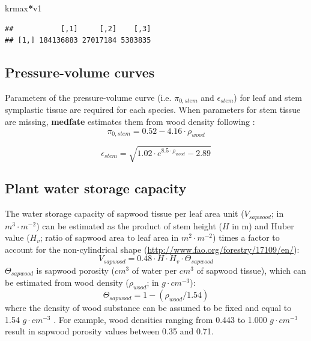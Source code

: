 \documentclass[]{book}
\newenvironment{Shaded}{\begin{snugshade}}{\end{snugshade}}
\newcommand{\OperatorTok}[1]{\textcolor[rgb]{0.81,0.36,0.00}{\textbf{#1}}}
\newcommand{\NormalTok}[1]{#1}
\begin{document}
\begin{Shaded}
\begin{Highlighting}[]
\NormalTok{krmax}\OperatorTok{*}\NormalTok{v1}
\end{Highlighting}
\end{Shaded}

\begin{verbatim}
##           [,1]     [,2]    [,3]
## [1,] 184136883 27017184 5383835
\end{verbatim}

\hypertarget{pressure-volume-curves-1}{%
\subsection{Pressure-volume curves}\label{pressure-volume-curves-1}}

Parameters of the pressure-volume curve (i.e. \(\pi_{0,stem}\) and \(\epsilon_{stem}\)) for leaf and stem symplastic tissue are required for each species. When parameters for stem tissue are missing, \textbf{medfate} estimates them from wood density following \citet{Christoffersen2016}:
\begin{equation}
\pi_{0,stem} = 0.52 - 4.16 \cdot \rho_{wood}
\end{equation}

\begin{equation}
\epsilon_{stem} = \sqrt{1.02 \cdot e^{8.5\cdot \rho_{wood}}-2.89}
\end{equation}

\hypertarget{plant-water-storage-capacity}{%
\subsection{Plant water storage capacity}\label{plant-water-storage-capacity}}

The water storage capacity of sapwood tissue per leaf area unit (\(V_{sapwood}\); in \(m^3 \cdot m^{-2}\)) can be estimated as the product of stem height (\(H\) in m) and Huber value (\(H_v\); ratio of sapwood area to leaf area in \(m^2 \cdot m^{-2}\)) times a factor to account for the non-cylindrical shape (\url{http://www.fao.org/forestry/17109/en/}):
\begin{equation}
V_{sapwood} = 0.48 \cdot H \cdot H_v \cdot \Theta_{sapwood}
\end{equation}
\(\Theta_{sapwood}\) is sapwood porosity (\(cm^3\) of water per \(cm^3\) of sapwood tissue), which can be estimated from wood density (\(\rho_{wood}\); in \(g \cdot cm^{-3}\)):
\begin{equation}
\Theta_{sapwood} = 1 - (\rho_{wood} / 1.54)
\end{equation}
where the density of wood substance can be assumed to be fixed and equal to 1.54 \(g \cdot cm^{-3}\) \citep{Dunlap1914}. For example, wood densities ranging from 0.443 to 1.000 \(g \cdot cm^{-3}\) result in sapwood porosity values between 0.35 and 0.71.
\end{document}
